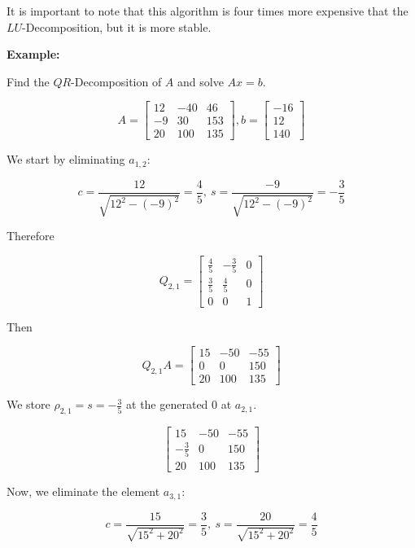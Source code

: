It is important to note that this algorithm is four times more expensive that the \(LU\)-Decomposition, but it is more stable.

\textbf{Example:}

Find the \(QR\)-Decomposition of \(A\) and solve \(Ax = b\). 

\[
    A = 
    \begin{bmatrix}
        12 & -40 & 46 \\ 
        -9 & 30 & 153 \\ 
        20 & 100 & 135
    \end{bmatrix}
    , 
    b = 
    \begin{bmatrix}
       -16 \\ 
       12 \\ 
       140
    \end{bmatrix}
\]


We start by eliminating \(a_{1,2}\): 

\[
    c = \frac{12}{\sqrt{12^2 - (-9)^2}} = \frac{4}{5}, \ 
    s = \frac{-9}{\sqrt{12^2 - (-9)^2}} = - \frac{3}{5}
\]

Therefore 

\[
    Q_{2,1} =
    \begin{bmatrix}
        \frac{4}{5} & - \frac{3}{5} & 0 \\ 
        \frac{3}{5} & \frac{4}{5} & 0 \\ 
        0 & 0 & 1
    \end{bmatrix}
\]

Then

\[
    Q_{2,1}A =
    \begin{bmatrix}
        15 & -50 & -55 \\ 
        0 & 0 & 150 \\ 
        20 & 100 & 135
    \end{bmatrix}
\]

We store \(\rho_{2,1} = s = - \frac{3}{5}\) at the generated 0 at \(a_{2,1}\).

\[
    \begin{bmatrix}
        15 & -50 & -55 \\ 
        - \frac{3}{5} & 0 & 150 \\ 
        20 & 100 & 135
    \end{bmatrix}
\]

Now, we eliminate the element \(a_{3, 1}\):

\[
    c = \frac{15}{\sqrt{15^2 + 20^2}} = \frac{3}{5}, \ 
    s = \frac{20}{\sqrt{15^2 + 20^2}} = \frac{4}{5}
\]

